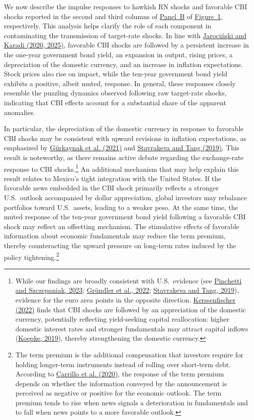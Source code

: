 \documentclass[\latexroot/\projectname]{subfiles}
\begin{document}
We now describe the impulse responses to hawkish RN shocks and favorable CBI shocks reported in the second and third columns of \hyperlink{Panel BF1}{Panel~B} of \hyperlink{Figure~1}{Figure~1}, respectively. This analysis helps clarify the role of each component in contaminating the transmission of target-rate shocks. In line with \hyperlink{Jarociński and Karadi (2025)}{Jarociński and Karadi (2020, 2025)}, favorable CBI shocks are followed by a persistent increase in the one-year government bond yield, an expansion in output, rising prices, a depreciation of the domestic currency, and an increase in inflation expectations. Stock prices also rise on impact, while the ten-year government bond yield exhibits a positive, albeit muted, response. In general, these responses closely resemble the puzzling dynamics observed following raw target-rate shocks, indicating that CBI effects account for a substantial share of the apparent anomalies.

In particular, the depreciation of the domestic currency in response to favorable CBI shocks may be consistent with upward revisions in inflation expectations, as emphasized by \hyperlink{Gurkaynak et al. (2021)}{G\"urkaynak et al. (2021)} and \hyperlink{Stavrakeva and Tang (2019)}{Stavrakeva and Tang (2019)}. This result is noteworthy, as there remains active debate regarding the exchange-rate response to CBI shocks.\footnote{While our findings are broadly consistent with U.S.\ evidence (see \hyperlink{Pinchetti and Szczepaniak (2023)}{Pinchetti and Szczepaniak, 2023}; \hyperlink{Gründler et al. (2022)}{Gr\"undler et al., 2022}; \hyperlink{Stavrakeva and Tang (2019)}{Stavrakeva and Tang, 2019}), evidence for the euro area points in the opposite direction. \hyperlink{Kerssenfischer (2022)}{Kerssenfischer (2022)} finds that CBI shocks are followed by an appreciation of the domestic currency, potentially reflecting yield-seeking capital reallocation: higher domestic interest rates and stronger fundamentals may attract capital inflows (\hyperlink{Koepke (2019)}{Koepke, 2019}), thereby strengthening the domestic currency.} An additional mechanism that may help explain this result relates to Mexico’s tight integration with the United States. If the favorable news embedded in the CBI shock primarily reflects a stronger U.S.\ outlook accompanied by dollar appreciation, global investors may rebalance portfolios toward U.S.\ assets, leading to a weaker peso. At the same time, the muted response of the ten-year government bond yield following a favorable CBI shock may reflect an offsetting mechanism. The stimulative effects of favorable information about economic fundamentals may reduce the term premium, thereby counteracting the upward pressure on long-term rates induced by the policy tightening.\footnote{The term premium is the additional compensation that investors require for holding longer-term instruments instead of rolling over short-term debt. According to \hyperlink{Carrillo et al. (2020)}{Carrillo et al. (2020)}, the response of the term premium depends on whether the information conveyed by the announcement is perceived as negative or positive for the economic outlook. The term premium tends to rise when news signals a deterioration in fundamentals and to fall when news points to a more favorable outlook.}
\end{document}
